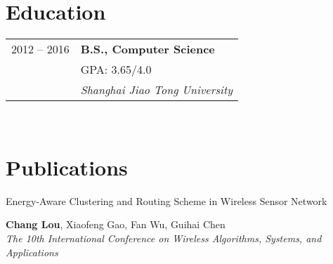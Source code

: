 \documentclass[10pt]{article} %
\begin{document}
{\begin{minipage}[t]{0.44\textwidth}

\section{Education} 

\begin{tabular}{rl} %


2012 -- 2016 & \textbf{B.S., Computer Science} \\ 
& \textsc{GPA: 3.65/4.0} \\ 
& \textit{Shanghai Jiao Tong University}\\

	

\end{tabular}\\[10pt]




\section{Publications} 




{\raggedright\large Energy-Aware Clustering and Routing Scheme in Wireless Sensor Network\\
[5pt]}
\normalsize{\textbf{Chang Lou}, Xiaofeng Gao, Fan Wu, Guihai Chen}\\
\textit{The 10th International Conference on Wireless Algorithms, Systems, and Applications}\\



\end{minipage}}
\end{document}
